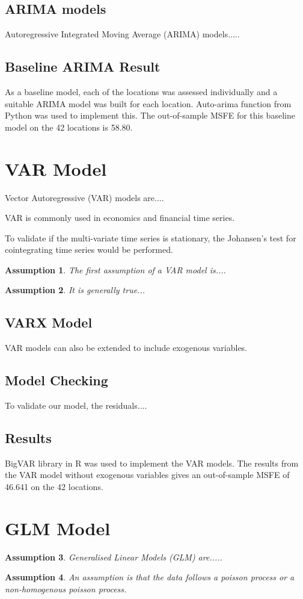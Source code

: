 \documentclass[10pt, letterpaper] {article}
\newtheorem{assumption}{Assumption}
\begin{document}
\subsection{ARIMA models}
Autoregressive Integrated Moving Average (ARIMA) models.....

\subsection{Baseline ARIMA Result}
As a baseline model, each of the locations was assessed individually and a suitable ARIMA model was built for each location. Auto-arima function from Python was used to implement this. The out-of-sample MSFE for this baseline model on the 42 locations is 58.80. 

\section{VAR Model}
Vector Autoregressive (VAR) models are....

VAR is commonly used in economics and financial time series. 

To validate if the multi-variate time series is stationary, the Johansen's test for cointegrating time series would be performed.
\begin{assumption}
The first assumption of a VAR model is....
\end{assumption}
\begin{assumption}
It is generally true...
\end{assumption}

\subsection{VARX Model}
VAR models can also be extended to include exogenous variables. 

\subsection{Model Checking}
To validate our model, the residuals....

\subsection{Results}
BigVAR library in R was used to implement the VAR models. The results from the VAR model without exogenous variables gives an out-of-sample MSFE of 46.641 on the 42 locations. 


\section{GLM Model}
\begin{assumption}
Generalised Linear Models (GLM) are.....
\end{assumption}
\begin{assumption}
An assumption is that the data follows a poisson process or a non-homogenous poisson process. 
\end{assumption}
\end{document}
